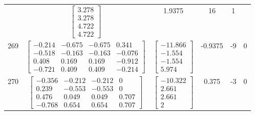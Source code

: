 \documentclass[a4paper,12pt]{article}
\begin{document}
\begin{tabular}{c c c c c c}
&
$\begin{bmatrix} 3.278 \\ 3.278 \\ 4.722 \\ 4.722 \end{bmatrix}$
&
1.9375
&
16
&
1
\\
269
&
$\begin{bmatrix} -0.214 & -0.675 & -0.675 & 0.341 \\ -0.518 & -0.163 & -0.163 & -0.076 \\ 0.408 & 0.169 & 0.169 & -0.912 \\ -0.721 & 0.409 & 0.409 & -0.214 \end{bmatrix}$
&
$\begin{bmatrix} -11.866 \\ -1.554 \\ -1.554 \\ 5.974 \end{bmatrix}$
&
-0.9375
&
-9
&
0
\\
270
&
$\begin{bmatrix} -0.356 & -0.212 & -0.212 & 0 \\ 0.239 & -0.553 & -0.553 & 0 \\ 0.476 & 0.049 & 0.049 & 0.707 \\ -0.768 & 0.654 & 0.654 & 0.707 \end{bmatrix}$
&
$\begin{bmatrix} -10.322 \\ 2.661 \\ 2.661 \\ 2 \end{bmatrix}$
&
0.375
&
-3
&
0
\\
\end{tabular} \egroup \newpage
\end{document}
